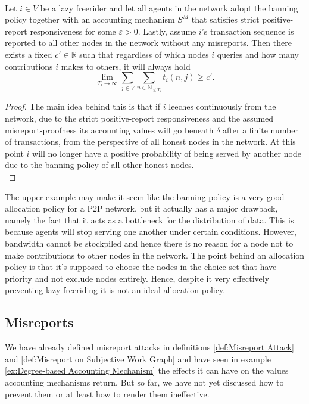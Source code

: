 \begin{example}[]\ \\
\label{ex:Lazy Freeriding prevented by Positive-Report Responsiveness}
\noindent{}Let $i\in{}V$ be a lazy freerider and let all agents in the network adopt the banning policy together with an accounting mechanism $S^M$ that satisfies strict positive-report responsiveness for some $\varepsilon > 0$. Lastly, assume $i$'s transaction sequence is reported to all other nodes in the network without any misreports. Then there exists a fixed $c'\in\mathbb{R}$ such that regardless of which nodes $i$ queries and how many contributions $i$ makes to others, it will always hold
\[
\lim\limits_{T_i\rightarrow\infty}\sum\limits_{j\in{}V}\sum\limits_{n\in\mathbb{N}_{\leq{}T_i}}t_i(n,j) \geq{} c'.
\]
\end{example}
\begin{proof}
\noindent{}The main idea behind this is that if $i$ leeches continuously from the network, due to the strict positive-report responsiveness and the assumed misreport-proofness its accounting values will go beneath $\delta$ after a finite number of transactions, from the perspective of all honest nodes in the network. At this point $i$ will no longer have a positive probability of being served by another node due to the banning policy of all other honest nodes.\vspace{1em}\\
\end{proof}
 
\noindent{}The upper example may make it seem like the banning policy is a very good allocation policy for a P2P network, but it actually has a major drawback, namely the fact that it acts as a bottleneck for the distribution of data. This is because agents will stop serving one another under certain conditions. However, bandwidth cannot be stockpiled and hence there is no reason for a node not to make contributions to other nodes in the network. The point behind an allocation policy is that it's supposed to choose the nodes in the choice set that have priority and not exclude nodes entirely. Hence, despite it very effectively preventing lazy freeriding it is not an ideal allocation policy.\vspace{1em}\\ 
 
\subsection{Misreports}
\label{subsec:Misreports}
\noindent{}We have already defined misreport attacks in definitions \ref{def:Misreport Attack} and \ref{def:Misreport on Subjective Work Graph} and have seen in example \ref{ex:Degree-based Accounting Mechanism} the effects it can have on the values accounting mechanisms return. But so far, we have not yet discussed how to prevent them or at least how to render them ineffective. \vspace{1em}\\

